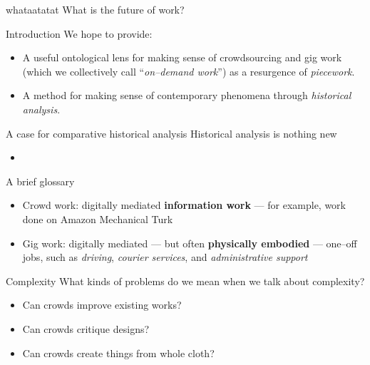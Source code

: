 \documentclass{beamer}
\begin{document}
\begin{frame}[standout]{whataatatat}
    What is the future of work?


\end{frame}


\begin{frame}{Introduction}
  We hope to provide:
      \begin{itemize}
        \item A useful ontological lens for making sense of crowdsourcing and gig work (which we collectively call ``\textit{on--demand work}'') as a resurgence of \textit{piecework}.
        \item A method for making sense of contemporary phenomena through \textit{historical analysis}.
      \end{itemize}
\end{frame}

\begin{frame}{A case for comparative historical analysis}
Historical analysis is nothing new
    \begin{itemize}
      \item \textcite{Wyche2006,bodker1993historical}
    \end{itemize}
\end{frame}


\begin{frame}{A brief glossary}
    \begin{itemize}
      \item Crowd work: digitally mediated \textbf{information work}
      --- for example, work done on Amazon Mechanical Turk~\cite{crowdworkFuture}
      \item Gig work: digitally mediated --- but often \textbf{physically embodied} --- one--off jobs,
      such as
      \textit{driving},
      \textit{courier services},
      and \textit{administrative support}~\cite{friedman2014workers,Parigi:2016:GE:3026779.3013496}
    \end{itemize}
\end{frame}


\begin{frame}{Complexity}
  What kinds of problems do we mean when we talk about complexity?
  \begin{itemize}
    \item Can crowds improve existing works?~\cite{bernsteinSoylent,Kim:2014:CSI:2556288.2556986}
    \item Can crowds critique designs?~\cite{yuanAlmost}
    \item Can crowds create things from whole cloth?~\cite{KimStoria,Kim2017,Hahn:2016:KAB:2858036.2858364,Lasecki:2014:LSR:2661334.2661352}
  \end{itemize}
\end{frame}
\end{document}
